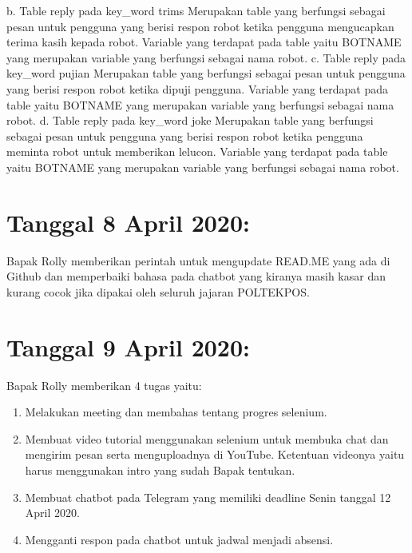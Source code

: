 \documentclass{article}
\newcounter{saveenumi}
\newcommand{\seti}{\setcounter{saveenumi}{\value{enumi}}} %
\begin{document}
\begin{enumerate}
		\newline
		b.	Table reply pada key\_word trims
		Merupakan table yang berfungsi sebagai pesan untuk pengguna yang berisi respon robot ketika pengguna mengucapkan terima kasih kepada robot. Variable yang terdapat pada table yaitu BOTNAME yang merupakan variable yang berfungsi sebagai nama robot.
		\newline
		c.	Table reply pada key\_word pujian
		Merupakan table yang berfungsi sebagai pesan untuk pengguna yang berisi respon robot ketika dipuji pengguna. Variable yang terdapat pada table yaitu BOTNAME yang merupakan variable yang berfungsi sebagai nama robot.
		\newline
		d.	Table reply pada key\_word joke
		Merupakan table yang berfungsi sebagai pesan untuk pengguna yang berisi respon robot ketika pengguna meminta robot untuk memberikan lelucon. Variable yang terdapat pada table yaitu BOTNAME yang merupakan variable yang berfungsi sebagai nama robot.
		\newline
		\newline
		\seti %
	\end{enumerate}


\section{Tanggal 8 April 2020:}
Bapak Rolly memberikan perintah untuk mengupdate READ.ME yang ada di Github dan memperbaiki bahasa pada chatbot yang kiranya masih kasar dan kurang cocok jika dipakai oleh seluruh jajaran POLTEKPOS.
\newline
\newline

\section{Tanggal 9 April 2020:}
Bapak Rolly memberikan 4 tugas yaitu:
	\newline
	\begin{enumerate}
			\item Melakukan meeting dan membahas tentang progres selenium.
			\newline
			\item Membuat video tutorial menggunakan selenium untuk membuka chat dan mengirim pesan serta menguploadnya di YouTube. Ketentuan videonya yaitu harus menggunakan intro yang sudah Bapak tentukan.
			\newline
			\item Membuat chatbot pada Telegram yang memiliki deadline Senin tanggal 12 April 2020.
			\newline
			\item Mengganti respon pada chatbot untuk jadwal menjadi absensi.
			\newline
		\seti %
	\end{enumerate}
	
\end{document}
